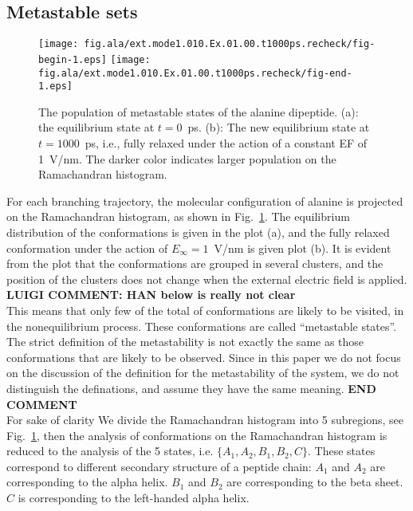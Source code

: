 \documentclass[a4paper,preprint,unsortedaddress,onecolumn]{revtex4-1}
\begin{document}

\subsection{Metastable sets}

\begin{figure}
  \centering
  \texttt{[image: fig.ala/ext.mode1.010.Ex.01.00.t1000ps.recheck/fig-begin-1.eps]}
  \texttt{[image: fig.ala/ext.mode1.010.Ex.01.00.t1000ps.recheck/fig-end-1.eps]}
  \caption{The population of metastable states of the alanine dipeptide.
    (a): the
    equilibrium state at $t=0$~\textsf{ps}. (b): The new equilibrium
    state at $t=1000$~\textsf{ps}, i.e., fully relaxed under the
    action of a constant EF of 1~V/nm. The darker color
    indicates larger population on the Ramachandran histogram.}
  \label{fig:tmp4}
\end{figure}


For each branching trajectory,  the molecular configuration of alanine is projected on
the Ramachandran histogram, as
shown in Fig.~\ref{fig:tmp4}. The equilibrium distribution of the
conformations is given in the plot (a), and the fully relaxed
conformation under the action of $E_{\infty} = 1$~V/nm is given  plot (b).  It is
evident from the plot that the conformations are grouped in several clusters, and the
position of the clusters does not change when the external electric
field is applied.
{\bf LUIGI COMMENT: HAN below is really not clear}\\
This means that only few of the total of conformations are likely to be visited,
in the nonequilibrium process.
These conformations are called ``metastable states''.
The strict definition of the
metastability is not exactly the same as those conformations that are likely to be observed.
Since in this paper we do not focus on the discussion of the definition for the metastability of the system,
we do not distinguish the definations, and assume they have the same meaning.
{\bf END COMMENT}\\
For sake of clarity We divide the
Ramachandran histogram into 5 subregions, see Fig.~\ref{fig:tmp4},
then the analysis of conformations on the Ramachandran histogram is reduced to the
analysis of the 5 states, i.e. $\{A_1, A_2, B_1, B_2, C\}$.
These states
correspond to different secondary structure of a peptide chain:
$A_1$ and $A_2$ are
corresponding to the alpha helix. $B_1$ and $B_2$ are
corresponding to the beta sheet. $C$ is corresponding to the
left-handed alpha helix.
\end{document}
